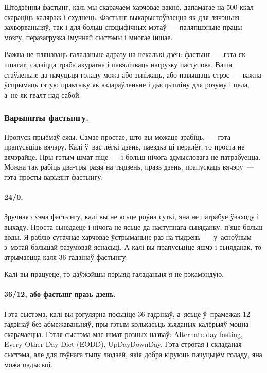 Штодзённы фастынг, калі мы скарачаем харчовае вакно, дапамагае на 500 ккал скараціць каляраж і схуднець. Фастынг выкарыстоўваецца як для лячэньня захворваньняў, так і для больш спэцыфічных мэтаў~--- паляпшэньне працы мозгу, перазагрузка імуннай сыстэмы і многае іншае. 


Важна не плянаваць галаданьне адразу на некалькі дзён: фастынг~--- гэта як шпагат, садзіцца трэба акуратна і павялічваць нагрузку паступова. Ваша стаўленьне да пачуцьця голаду можа або зьніжаць, або павышаць стрэс~--- важна ўспрымаць гэтую практыку як аздараўленьне і дысцыпліну для розуму і цела, а~не як гвалт над сабой.

\subsubsection{Варыянты фастынгу.}
Пропуск прыёмаў ежы. Самае простае, што вы можаце зрабіць,~--- гэта прапусьціць вячэру. Калі ў~вас лёгкі дзень, паездка ці пералёт, то проста не вячэрайце. Пры гэтым шмат піце~--- і больш нічога адмысловага не патрабуецца. Можна так рабіць два-тры разы на тыдзень, празь дзень, прапускаць вячэру~--- гэта просты варыянт фастынгу.

\paragraph{24/0.} Зручная схэма фастынгу, калі вы не ясьце роўна суткі, яна не патрабуе ўваходу і выхаду. Проста сьнедаеце і нічога не ясьце да наступнага сьняданку, п'яце больш воды. Я раблю сутачнае харчовае ўстрыманьне раз на тыдзень~--- у~асноўным з~мэтай большай разумовай яснасьці. А калі вы прапусьціце яшчэ і сьняданак, то атрымаецца каля 36 гадзінаў фастынгу. 

Калі вы працуеце, то даўжэйшы пэрыяд галаданьня я не рэкамэндую.

\paragraph{36/12, або фастынг празь дзень.} Гэта сыстэма, калі вы рэгулярна посьціце 36 гадзінаў, а~ясьце ў~прамежак 12 гадзінаў без абмежаваньняў, пры гэтым колькасьць зьяданых калёрыяў моцна скарачаецца. Гэтая сыстэма мае шмат розных назваў: Alternate-day fasting, Every-Other-Day Diet (EODD), UpDayDownDay. Гэта строгая і складаная сыстэма, але для пэўнага тыпу людзей, якія добра кіруюць пачуцьцём голаду, яна можа падысьці.

